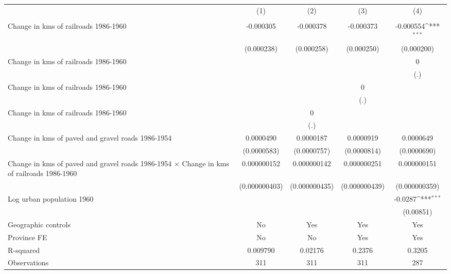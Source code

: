 {
\def\sym#1{\ifmmode^{#1}\else\(^{#1}\)\fi}
\begin{tabular}{l*{4}{c}}
\hline\hline
                &\multicolumn{1}{c}{(1)}&\multicolumn{1}{c}{(2)}&\multicolumn{1}{c}{(3)}&\multicolumn{1}{c}{(4)}\\
                &\multicolumn{1}{c}{}&\multicolumn{1}{c}{}&\multicolumn{1}{c}{}&\multicolumn{1}{c}{}\\
\hline
Change in kms of railroads 1986-1960&-0.000305         &-0.000378         &-0.000373         &-0.000554\sym{***}\\
                &(0.000238)         &(0.000258)         &(0.000250)         &(0.000200)         \\
[1em]
Change in kms of railroads 1986-1960&                  &                  &                  &        0         \\
                &                  &                  &                  &      (.)         \\
[1em]
Change in kms of railroads 1986-1960&                  &                  &        0         &                  \\
                &                  &                  &      (.)         &                  \\
[1em]
Change in kms of railroads 1986-1960&                  &        0         &                  &                  \\
                &                  &      (.)         &                  &                  \\
[1em]
Change in kms of paved and gravel roads 1986-1954&0.0000490         &0.0000187         &0.0000919         &0.0000649         \\
                &(0.0000583)         &(0.0000757)         &(0.0000814)         &(0.0000690)         \\
[1em]
Change in kms of paved and gravel roads 1986-1954 $\times$ Change in kms of railroads 1986-1960&0.000000152         &0.000000142         &0.000000251         &0.000000151         \\
                &(0.000000403)         &(0.000000435)         &(0.000000439)         &(0.000000359)         \\
[1em]
Log urban population 1960&                  &                  &                  &  -0.0287\sym{***}\\
                &                  &                  &                  &(0.00851)         \\
\hline
Geographic controls&       No         &      Yes         &      Yes         &      Yes         \\
Province FE     &       No         &       No         &      Yes         &      Yes         \\
R-squared       & 0.009790         &  0.02176         &   0.2376         &   0.3205         \\
Observations    &      311         &      311         &      311         &      287         \\
\hline\hline
\end{tabular}
}
